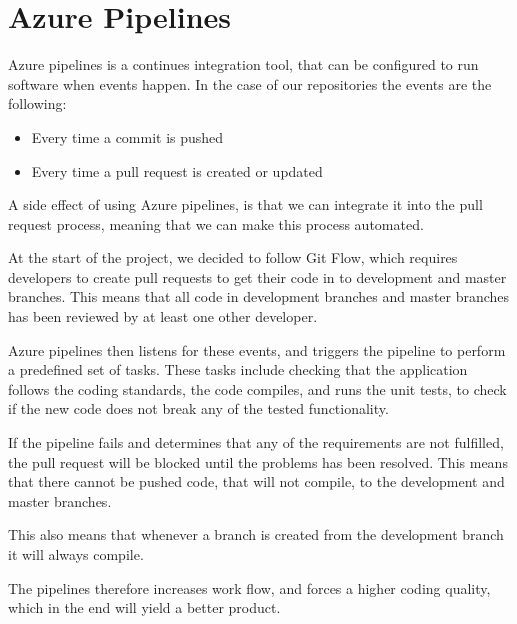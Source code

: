 \section{Azure Pipelines}
\label{azurepipelines}
Azure pipelines is a continues integration tool, that can be configured to run software when events happen.
In the case of our repositories the events are the following:
\begin{itemize}
    \item Every time a commit is pushed
    \item Every time a pull request is created or updated
\end{itemize}

A side effect of using Azure pipelines, is that we can integrate it into the pull request process, meaning that we can make this process automated. 

At the start of the project, we decided to follow Git Flow, which requires developers to create pull requests to get their code in to development and master branches.
This means that all code in development branches and master branches has been reviewed by at least one other developer.

Azure pipelines then listens for these events, and triggers the pipeline to perform a predefined set of tasks.
These tasks include checking that the application follows the coding standards, the code compiles, and runs the unit tests, to check if the new code does not break any of the tested functionality. 

If the pipeline fails and determines that any of the requirements are not fulfilled, the pull request will be blocked until the problems has been resolved.
This means that there cannot be pushed code, that will not compile, to the development and master branches.

This also means that whenever a branch is created from the development branch it will always compile.

The pipelines therefore increases work flow, and forces a higher coding quality, which in the end will yield a better product.






